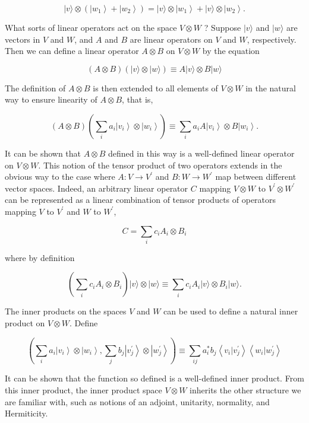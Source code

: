 $$
|v\rangle \otimes\left(\left|w_{1}\right\rangle+\left|w_{2}\right\rangle\right)=|v\rangle \otimes\left|w_{1}\right\rangle+|v\rangle \otimes\left|w_{2}\right\rangle .
$$

What sorts of linear operators act on the space $V \otimes W$ ? Suppose $|v\rangle$ and $|w\rangle$ are vectors in $V$ and $W$, and $A$ and $B$ are linear operators on $V$ and $W$, respectively. Then we can define a linear operator $A \otimes B$ on $V \otimes W$ by the equation

$$
(A \otimes B)(|v\rangle \otimes|w\rangle) \equiv A|v\rangle \otimes B|w\rangle
$$

The definition of $A \otimes B$ is then extended to all elements of $V \otimes W$ in the natural way to ensure linearity of $A \otimes B$, that is,

$$
(A \otimes B)\left(\sum_{i} a_{i}\left|v_{i}\right\rangle \otimes\left|w_{i}\right\rangle\right) \equiv \sum_{i} a_{i} A\left|v_{i}\right\rangle \otimes B\left|w_{i}\right\rangle .
$$

It can be shown that $A \otimes B$ defined in this way is a well-defined linear operator on $V \otimes W$. This notion of the tensor product of two operators extends in the obvious way to the case where $A: V \rightarrow V^{\prime}$ and $B: W \rightarrow W^{\prime}$ map between different vector spaces. Indeed, an arbitrary linear operator $C$ mapping $V \otimes W$ to $V^{\prime} \otimes W^{\prime}$ can be represented as a linear combination of tensor products of operators mapping $V$ to $V^{\prime}$ and $W$ to $W^{\prime}$,

$$
C=\sum_{i} c_{i} A_{i} \otimes B_{i}
$$

where by definition

$$
\left(\sum_{i} c_{i} A_{i} \otimes B_{i}\right)|v\rangle \otimes|w\rangle \equiv \sum_{i} c_{i} A_{i}|v\rangle \otimes B_{i}|w\rangle .
$$

The inner products on the spaces $V$ and $W$ can be used to define a natural inner product on $V \otimes W$. Define

$$
\left(\sum_{i} a_{i}\left|v_{i}\right\rangle \otimes\left|w_{i}\right\rangle, \sum_{j} b_{j}\left|v_{j}^{\prime}\right\rangle \otimes\left|w_{j}^{\prime}\right\rangle\right) \equiv \sum_{i j} a_{i}^{*} b_{j}\left\langle v_{i} | v_{j}^{\prime}\right\rangle\left\langle w_{i} | w_{j}^{\prime}\right\rangle
$$

It can be shown that the function so defined is a well-defined inner product. From this inner product, the inner product space $V \otimes W$ inherits the other structure we are familiar with, such as notions of an adjoint, unitarity, normality, and Hermiticity.

